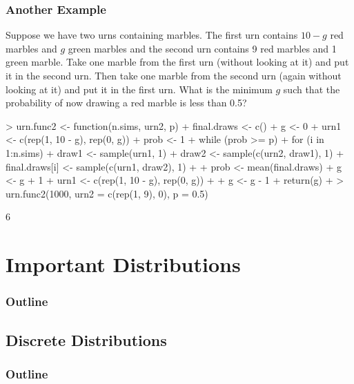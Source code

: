 \documentclass{beamer}
\begin{document}
\begin{frame}[fragile]
\frametitle{Another Example}
\pause
\small
Suppose we have two urns containing marbles.  The first urn contains $10-g$
red marbles and $g$ green marbles and the second urn contains 9 red
marbles and 1 green marble.  Take one marble from the first urn
(without looking at it) and put it in the second urn.  Then take one
marble from the second urn (again without looking at it) and put it in
the first urn.  What is the minimum $g$ such that the probability of
now drawing a red marble is less than 0.5?
\pause
\medskip
\tiny
\begin{Schunk}
\begin{Sinput}
> urn.func2 <- function(n.sims, urn2, p) {
+     final.draws <- c()
+     g <- 0
+     urn1 <- c(rep(1, 10 - g), rep(0, g))
+     prob <- 1
+     while (prob >= p) {
+         for (i in 1:n.sims) {
+             draw1 <- sample(urn1, 1)
+             draw2 <- sample(c(urn2, draw1), 1)
+             final.draws[i] <- sample(c(urn1, draw2), 1)
+         }
+         prob <- mean(final.draws)
+         g <- g + 1
+         urn1 <- c(rep(1, 10 - g), rep(0, g))
+     }
+     g <- g - 1
+     return(g)
+ }
> urn.func2(1000, urn2 = c(rep(1, 9), 0), p = 0.5)
\end{Sinput}
\begin{Soutput}
[1] 6
\end{Soutput}
\end{Schunk}
\normalsize
\end{frame}

\section{Important Distributions}


\begin{frame}
\frametitle{Outline}
\tableofcontents[currentsection]
\end{frame}

\subsection{Discrete Distributions}


\begin{frame}
\frametitle{Outline}
\tableofcontents[currentsubsection]
\end{frame}
\end{document}

